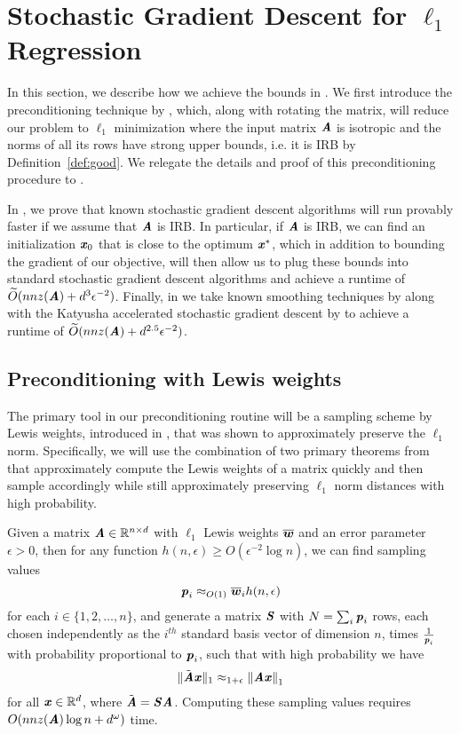 \section{Stochastic Gradient Descent for $\ell_1$ Regression}\label{sec:SGDforl1}

In this section, we describe how we achieve the bounds in . We first introduce the preconditioning technique by \cite{cohenpeng}, which, along with rotating the matrix,
will reduce our problem to $\ell_1$ minimization where the input matrix $\AA$ is isotropic and the norms of all its rows have strong upper bounds, i.e. it is IRB by Definition~\ref{def:good}. We relegate the details and proof of this preconditioning procedure to .

In , we prove that known stochastic gradient descent algorithms
will run provably faster if we assume that $\AA$ is IRB. In particular, if $\AA$ is IRB, we can find an initialization $\xx_0$ that is close to the optimum $\xx^*$,
which in addition to bounding the gradient of our objective,
will then allow us to plug these bounds into standard stochastic gradient descent algorithms
and achieve a runtime of $\Otil(nnz(\AA) + d^3\epsilon^{-2})$. Finally, in  we take known smoothing techniques by \cite{AllenZhuH16}
along with the Katyusha accelerated stochastic gradient descent by \cite{AllenZhu17} to achieve a runtime of $\Otil(nnz(\AA) + d^{2.5}\epsilon^{-2})$.

\subsection{Preconditioning with Lewis weights}
\label{sec:LewisPreconditioning}
The primary tool in our preconditioning routine will be a sampling scheme by Lewis weights, introduced in \cite{cohenpeng}, that was shown to approximately preserve the $\ell_1$ norm.
Specifically, we will use the combination of two primary theorems from \cite{cohenpeng}
that approximately compute the Lewis weights of a matrix quickly
and then sample accordingly while still approximately
preserving $\ell_1$ norm distances with high probability.

\begin{theorem}
	\label{thm:lewisWeights}
	Given a matrix $\AA \in \R^{n \times d}$
	with $\ell_1$ Lewis weights $\lw$ and
	an error parameter $\epsilon > 0$,
	then for any function $h(n,\epsilon) \geq O(\epsilon^{-2}\log{n})$,
	we can find sampling values
	\[\pp_i \approx_{O(1)} \lw_i h(n,\epsilon)\]
	for each $i \in \{1,2, \ldots, n\}$,
	and generate a matrix $\SS$ with $N = \sum_i\pp_i$ rows,
	each chosen independently as the $i^{th}$ standard basis vector of dimension $n$,
	times $\frac{1}{\pp_i}$ with probability proportional to $\pp_i$,
	such that with high probability we have 
	\[ \textstyle \|\tilde{\AA}\xx\|_1 \approx_{1+\epsilon}\norm{\AA\xx}_1\]
	for all $\xx \in \R^d$, where $\tilde{\AA} = \SS\AA$. 
	Computing these sampling values requires
	$O(nnz(\AA)\log{n} + d^{\omega})$ time.
\end{theorem} 

